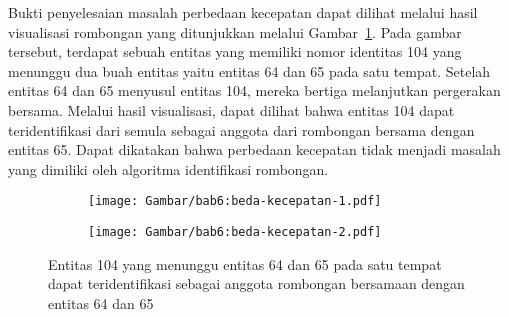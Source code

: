 Bukti penyelesaian masalah perbedaan kecepatan dapat dilihat melalui hasil visualisasi rombongan yang ditunjukkan melalui Gambar~\ref{bab6:solusi-beda-kecepatan}. Pada gambar tersebut, terdapat sebuah entitas yang memiliki nomor identitas 104 yang menunggu dua buah entitas yaitu entitas 64 dan 65 pada satu tempat. Setelah entitas 64 dan 65 menyusul entitas 104, mereka bertiga melanjutkan pergerakan bersama. Melalui hasil visualisasi, dapat dilihat bahwa entitas 104 dapat teridentifikasi dari semula sebagai anggota dari rombongan bersama dengan entitas 65. Dapat dikatakan bahwa perbedaan kecepatan tidak menjadi masalah yang dimiliki oleh algoritma identifikasi rombongan.

\begin{figure}[h]
    \centering
    \captionsetup{width=.85\textwidth}
    \begin{subfigure}[h]{0.425\textwidth}
        \centering
        \texttt{[image: Gambar/bab6:beda-kecepatan-1.pdf]}
    \end{subfigure}
    \begin{subfigure}[h]{0.45\textwidth}
        \centering
        \texttt{[image: Gambar/bab6:beda-kecepatan-2.pdf]}
    \end{subfigure}
    \caption[Penyelesaian masalah beda kecepatan pada data CBE]{Entitas 104 yang menunggu entitas 64 dan 65 pada satu tempat dapat teridentifikasi sebagai anggota rombongan bersamaan dengan entitas 64 dan 65}
    \label{bab6:solusi-beda-kecepatan}
\end{figure}
